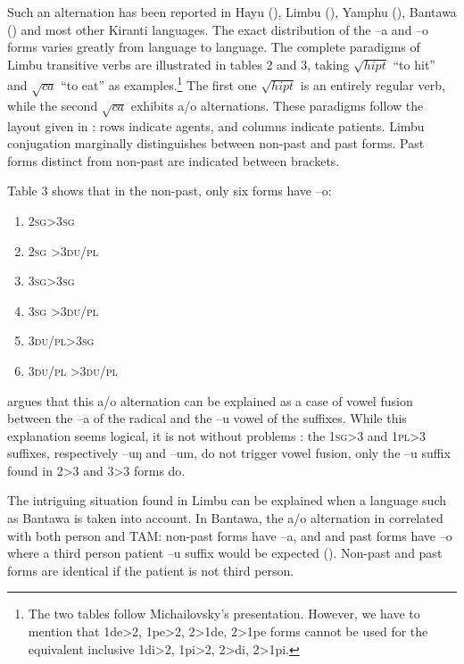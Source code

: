 \documentclass[oldfontcommands,twoside,a4paper,12pt]{memoir}
\newcommand{\ipa}[1]{{\phon #1}}
\newcommand{\du}{\textsc{du}}
\newcommand{\pl}{\textsc{pl}}
\newcommand{\sg}{\textsc{sg}}
\newcommand{\racine}[1]{\begin{math}\sqrt{#1}\end{math}}
\begin{document}
Such an alternation has been reported in Hayu (\citealt[pp. 101-3]{michailovsky88}), Limbu (\citealt[pp. 392-5]{driem87}), Yamphu (\citealt[p. 165]{rutgers98yamphu}), Bantawa (\citealt[pp. 401-2]{doornenbal09}) and most other Kiranti languages. The exact distribution of the --a and --o forms varies greatly from language to language. The complete paradigms of Limbu transitive verbs are illustrated in tables 2 and 3, taking \racine{hipt} ``to hit'' and \racine{ca} ``to eat'' as examples.\footnote{The two tables follow Michailovsky's presentation. However, we have to mention that 1de>2, 1pe>2, 2>1de, 2>1pe forms cannot be used for the equivalent inclusive 1di>2, 1pi>2, 2>di, 2>1pi. } The first one  \racine{hipt} is an entirely regular verb, while the second \racine{ca} exhibits a/o alternations. These paradigms follow the layout given in \citet[xiii]{michailovsky02dico}: rows indicate agents, and columns indicate patients. Limbu conjugation marginally distinguishes between non-past and past forms. Past forms distinct from non-past are indicated between brackets.

Table 3 shows that in the non-past, only six forms have --o: 

\begin{enumerate}
\setlength{\itemsep}{0in}
\item 2\sg{}>3\sg{}
\item 2\sg{} >3\du{}/\pl{}
\item 3\sg{}>3\sg{}
\item 3\sg{} >3\du{}/\pl{}
\item 3\du{}/\pl{}>3\sg{}
\item 3\du{}/\pl{} >3\du{}/\pl{}
\end{enumerate}
\citet[xiv]{michailovsky02dico} argues that this a/o alternation can be explained as a case of vowel fusion between the --a of the radical and the --u vowel of the suffixes. While this explanation seems logical, it is not without problems : the 1\sg{}>3 and 1\pl{}>3 suffixes, respectively --\ipa{uŋ} and --\ipa{um}, do not trigger vowel fusion, only the --\ipa{u} suffix found in 2>3 and 3>3 forms do.

The intriguing situation found in Limbu can be explained when a language such as Bantawa is taken into account. In Bantawa, the a/o alternation in correlated with both person and TAM: non-past forms have --a, and and past forms have --o where a third person patient --u  suffix would be expected (\citealt[p. 138]{doornenbal09}). Non-past and past forms are identical if the patient is not third person. 
\end{document}
